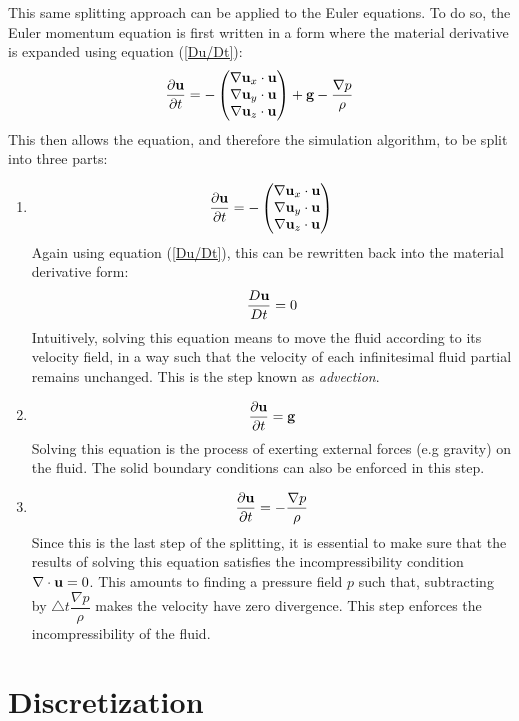 This same splitting approach can be applied to the Euler equations. To do so, the Euler momentum equation is first written in a form where the material derivative is expanded using equation (\ref{Du/Dt}):
$$
\frac{\partial \textbf{u}}{\partial t}   =  -\begin{pmatrix}
    \nabla \textbf{u}_x  \cdot \textbf{u}\\
     \nabla \textbf{u}_y \cdot \textbf{u}\\
     \nabla \textbf{u}_z \cdot \textbf{u}
  \end{pmatrix}
  + \textbf{g}
  -\frac{\nabla p}{\rho} 
$$
This then allows the equation, and therefore the simulation algorithm, to be split into three parts:
\begin{enumerate}
    \item
    $$
    \frac{\partial \textbf{u}}{\partial t}   =  -\begin{pmatrix}
        \nabla \textbf{u}_x  \cdot \textbf{u}\\
         \nabla \textbf{u}_y \cdot \textbf{u}\\
         \nabla \textbf{u}_z \cdot \textbf{u}\end{pmatrix} 
    $$
    Again using equation (\ref{Du/Dt}), this can be rewritten back into the material derivative form:
    $$
    \dfrac{D\textbf{u}}{Dt} = 0
    $$
    Intuitively, solving this equation means to move the fluid according to its velocity field, in a way such that the velocity of each infinitesimal fluid partial remains unchanged. This is the step known as \textit{advection}. 

    \item
    $$
    \frac{\partial \textbf{u}}{\partial t}   = \textbf{g}
    $$
    Solving this equation is the process of exerting external forces (e.g gravity) on the fluid. The solid boundary conditions can also be enforced in this step.

    \item
    $$
    \frac{\partial \textbf{u}}{\partial t}   = -\frac{\nabla p}{\rho} 
    $$
    Since this is the last step of the splitting, it is essential to make sure that the results of solving this equation satisfies the incompressibility condition $\nabla \cdot \textbf{u} = 0$. This amounts to finding a pressure field $p$ such that, subtracting by $\triangle t \dfrac{\nabla p}{\rho}$ makes the velocity have zero divergence. This step enforces the incompressibility of the fluid.

\end{enumerate}



\section{Discretization}

